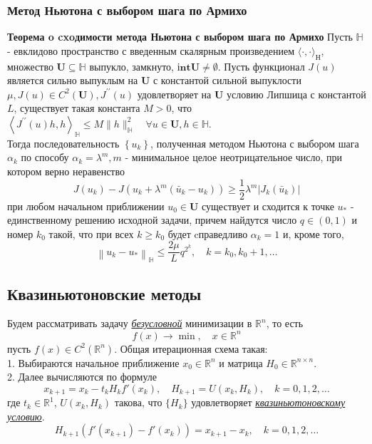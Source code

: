 \documentclass[A4]{article}
\begin{document}
\subsubsection{Метод Ньютона с выбором шага по Армихо}
\textbf{Теорема o cxoдимости метода Ньютона с выбором шага по Армихо} Пусть $\mathbb{H}$ - евклидово пространство с введенным скалярным произведением $\langle\cdot, \cdot\rangle_{\mathbb{Н}}$, множество $\mathbf{U} \subseteq \mathbb{H} $ выпукло, замкнуто, $ \textbf{іnt}\mathbf{U} \neq \emptyset $.  Пусть функционал $ J(u) $ является сильно выпуклым на $ \mathbf{U} $ с константой сильной выпуклости $ \mu, J(u) \in C^{2}(\mathbf{U}), J^{\prime \prime}(u) $ удовлетворяет на $ \mathbf{U} $ условию Липшица с константой $ L$,  существует такая константа $ M>0$,  что $\left\langle J^{\prime \prime}(u) h, h\right\rangle_{\mathbb{H}} \leqslant M\|h\|_{\mathbb{H}}^{2} \quad \forall u \in \mathbf{U}, h \in \mathbb{H}$. \\
Тогда последовательность $ \left\{u_{k}\right\}$,  полученная методом Ньютона с выбором шага $ \alpha_{k} $ по способу $\alpha_{k}=\lambda^{m}, m $ - минимальное целое неотрицательное число, при котором верно неравенство
\begin{equation*}
J\left(u_{k}\right)-J\left(u_{k}+\lambda^{m}\left(\bar{u}_{k}-u_{k}\right)\right) \geqslant \frac{1}{2} \lambda^{m}\left|J_{k}\left(\bar{u}_{k}\right)\right|
\end{equation*}
при любом начальном приближении $ u_{0} \in \mathbf{U} $ существует и сходится к точке $ u_{*} $ - единственному решению исходной задачи, причем найдутся число $ q \in(0 ,1) $ и номер $ k_{0} $ такой, что при всех $ k \geqslant k_{0} $ будет cправедливо $ \alpha_{k}=1 $ и, кроме того,
\begin{equation*}
\left\|u_{k}-u_{*}\right\|_{\mathbb{H}} \leqslant \frac{2 \mu}{L} q^{2^{k}}, \quad k=k_{0}, k_{0}+1, \ldots
\end{equation*}
\subsection{Квазиньютоновские методы}
Будем рассматривать задачу \underline{\emph{безусловной}} минимизации в $\mathbb{R}^n$, то есть
\begin{equation*}
f(x)\rightarrow\min,\quad x\in\mathbb{R}^n
\end{equation*}
пусть $f(x)\in C^2(\mathbb{R}^n)$. Общая итерационная схема такая:\\
1. Выбираются начальное приближение $x_0\in\mathbb{R}^n$ и матрица $H_0\in\mathbb{R}^{n\times n}$. \\
2. Далее вычисляются по формуле
\begin{equation*}
x_{k+1}=x_k-t_kH_kf'(x_k),\quad H_{k+1}=U(x_k,H_k),\quad k=0,1,2,\ldots
\end{equation*}
где $t_k\in\mathbb{R}^1$, $U(x_k,H_k)$ такова, что $\{H_k \}$ удовлетворяет \underline{\emph{квазиньютоновскому условию}}.
\begin{equation*}
H_{k+1}(f'(x_{k+1})-f'(x_k))=x_{k+1}-x_k,\quad k=0,1,2,\ldots
\end{equation*}
\end{document}
